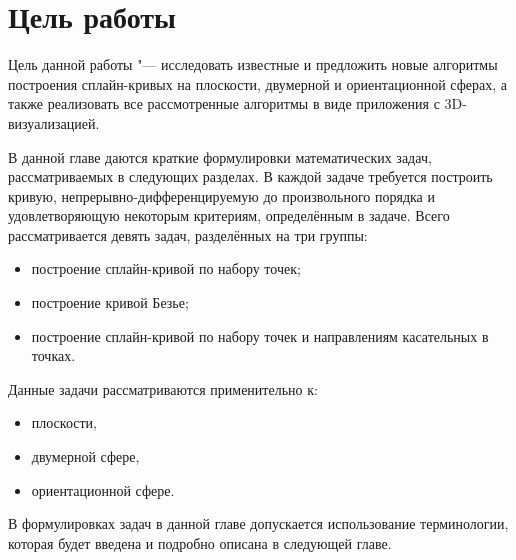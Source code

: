 \section{Цель работы}

Цель данной работы "--- исследовать известные и предложить новые алгоритмы построения сплайн-кривых на плоскости,
двумерной и ориентационной сферах, а также реализовать все рассмотренные алгоритмы в виде приложения с 3D-визуализацией.

В данной главе даются краткие формулировки математических задач, рассматриваемых в следующих разделах. В каждой
задаче требуется построить кривую, непрерывно-дифференцируемую до произвольного порядка и удовлетворяющую некоторым
критериям, определённым в задаче. Всего рассматривается девять задач, разделённых на три группы:

\begin{itemize}

\item построение сплайн-кривой по набору точек;
\item построение кривой Безье;
\item построение сплайн-кривой по набору точек и направлениям касательных в точках.

\end{itemize}

Данные задачи рассматриваются применительно к:

\begin{itemize}

\item плоскости,
\item двумерной сфере,
\item ориентационной сфере.

\end{itemize}

В формулировках задач в данной главе допускается использование терминологии, которая будет введена и подробно описана
в следующей главе.
